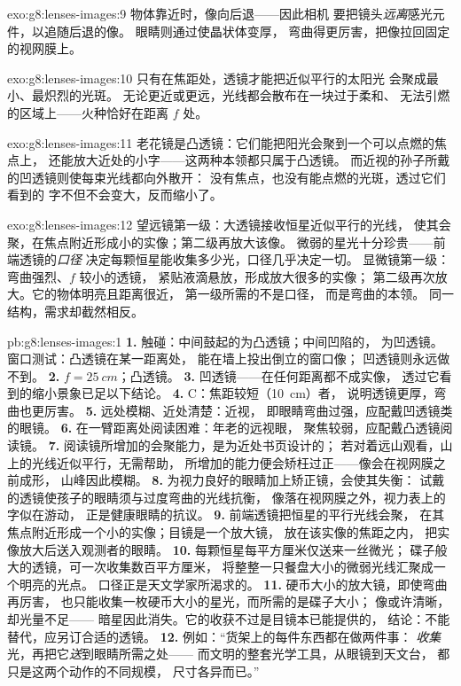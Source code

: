 \begin{solution}{exo:g8:lenses-images:9}
物体靠近时，像向后退——因此相机
要把镜头\emph{远离}感光元件，以追随后退的像。
眼睛则通过使晶状体变厚，
弯曲得更厉害，把像拉回固定的视网膜上。
\end{solution}

\begin{solution}{exo:g8:lenses-images:10}
只有在焦距处，透镜才能把近似平行的太阳光
会聚成最小、最炽烈的光斑。
无论更近或更远，光线都会散布在一块过于柔和、
无法引燃的区域上——火种恰好在距离 $f$ 处。
\end{solution}

\begin{solution}{exo:g8:lenses-images:11}
老花镜是凸透镜：它们能把阳光会聚到一个可以点燃的焦点上，
还能放大近处的小字——这两种本领都只属于凸透镜。
而近视的孙子所戴的凹透镜则使每束光线都向外散开：
没有焦点，也没有能点燃的光斑，透过它们看到的
字不但不会变大，反而缩小了。
\end{solution}

\begin{solution}{exo:g8:lenses-images:12}
望远镜第一级：大透镜接收恒星近似平行的光线，
使其会聚，在焦点附近形成小的实像；第二级再放大该像。
微弱的星光十分珍贵——前端透镜的\emph{口径}
决定每颗恒星能收集多少光，口径几乎决定一切。
显微镜第一级：弯曲强烈、$f$ 较小的透镜，
紧贴液滴悬放，形成放大很多的实像；
第二级再次放大。它的物体明亮且距离很近，
第一级所需的不是口径，
而是弯曲的本领。
同一结构，需求却截然相反。
\end{solution}

\begin{solution}{pb:g8:lenses-images:1}
\textbf{1.} 触碰：中间鼓起的为凸透镜；中间凹陷的，
为凹透镜。窗口测试：凸透镜在某一距离处，
能在墙上投出倒立的窗口像；
凹透镜则永远做不到。
\textbf{2.} $f = \qty{25}{cm}$；凸透镜。
\textbf{3.} 凹透镜——在任何距离都不成实像，
透过它看到的缩小景象已足以下结论。
\textbf{4.} C：焦距较短（\qty{10}{cm}）者，
说明透镜更厚，弯曲也更厉害。
\textbf{5.} 远处模糊、近处清楚：近视，
即眼睛弯曲过强，应配戴凹透镜类
的眼镜。
\textbf{6.} 在一臂距离处阅读困难：年老的远视眼，
聚焦较弱，应配戴凸透镜阅读镜。
\textbf{7.} 阅读镜所增加的会聚能力，是为近处书页设计的；
若对着远山观看，山上的光线近似平行，无需帮助，
所增加的能力便会矫枉过正——像会在视网膜之前成形，
山峰因此模糊。
\textbf{8.} 为视力良好的眼睛加上矫正镜，会使其失衡：
试戴的透镜使孩子的眼睛须与过度弯曲的光线抗衡，
像落在视网膜之外，视力表上的字似在游动，
正是健康眼睛的抗议。
\textbf{9.} 前端透镜把恒星的平行光线会聚，
在其焦点附近形成一个小的实像；目镜是一个放大镜，
放在该实像的焦距之内，
把实像放大后送入观测者的眼睛。
\textbf{10.} 每颗恒星每平方厘米仅送来一丝微光；
碟子般大的透镜，可一次收集数百平方厘米，
将整整一只餐盘大小的微弱光线汇聚成一个明亮的光点。
口径正是天文学家所渴求的。
\textbf{11.} 硬币大小的放大镜，即使弯曲再厉害，
也只能收集一枚硬币大小的星光，而所需的是碟子大小；
像或许清晰，却光量不足——
暗星因此消失。它的收获不过是目镜本已能提供的，
结论：不能替代，应另订合适的透镜。
\textbf{12.} 例如：“货架上的每件东西都在做两件事：
\emph{收集}光，再把它\emph{送}到眼睛所需之处——
而文明的整套光学工具，从眼镜到天文台，
都只是这两个动作的不同规模，
尺寸各异而已。”
\end{solution}
